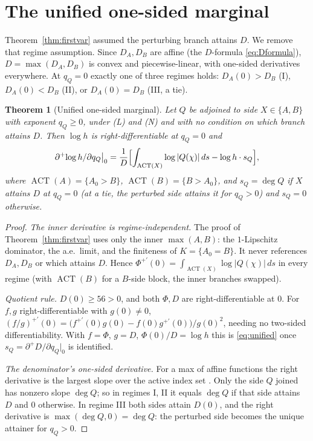 \documentclass[11pt,reqno]{amsart}
\theoremstyle{plain}
\newtheorem{theorem}{Theorem}
\theoremstyle{definition}
\theoremstyle{remark}
\newcommand{\dplus}{\partial^{+}}
\newcommand{\dA}{D_A}
\newcommand{\dB}{D_B}
\DeclareMathOperator{\ACT}{ACT}
\begin{document}
\section{The unified one-sided marginal}\label{sec:unified}

Theorem~\ref{thm:firstvar} assumed the perturbing branch attains $D$. We
remove that regime assumption. Since $\dA,\dB$ are affine (the $D$-formula \eqref{eq:Dformula}),
$D=\max(\dA,\dB)$ is convex and piecewise-linear, with one-sided derivatives
everywhere. At $q_Q=0$ exactly one of three regimes holds:
$\dA(0)>\dB$ (I), $\dA(0)<\dB$ (II), or $\dA(0)=\dB$ (III, a tie).

\begin{theorem}[Unified one-sided marginal]\label{thm:unified}
Let $Q$ be adjoined to side $X\in\{A,B\}$ with exponent $q_Q\ge0$, under
\emph{(L)} and \emph{(N)} and with no condition on which branch attains $D$. Then
$\log h$ is right-differentiable at $q_Q=0$ and
\begin{equation}\label{eq:unified}
  \dplus\!\log h/\partial q_Q\big|_0
  =\frac1D\Bigl[\int_{\ACT(X)}\log|Q(\chi)|\,ds-\log h\cdot s_Q\Bigr],
\end{equation}
where $\ACT(A)=\{A_0>B\}$, $\ACT(B)=\{B>A_0\}$, and $s_Q=\deg Q$ if $X$ attains $D$ at
$q_Q=0$ (at a tie, the perturbed side attains it for $q_Q>0$) and $s_Q=0$ otherwise.
\end{theorem}

\begin{proof}
\emph{The inner derivative is regime-independent.} The proof of
Theorem~\ref{thm:firstvar} uses only the inner $\max(A,B)$: the $1$-Lipschitz
dominator, the a.e.\ limit, and the finiteness of $K=\{A_0=B\}$. It never references
$\dA,\dB$ or which attains $D$. Hence
$\Phi^{+\prime}(0)=\int_{\ACT(X)}\log|Q(\chi)|\,ds$ in every regime (with $\ACT(B)$
for a $B$-side block, the inner branches swapped).

\emph{Quotient rule.} $D(0)\ge56>0$, and both $\Phi,D$ are right-differentiable at
$0$. For $f,g$ right-differentiable with $g(0)\ne0$,
$(f/g)^{+\prime}(0)=\bigl(f^{+\prime}(0)g(0)-f(0)g^{+\prime}(0)\bigr)/g(0)^2$, needing
no two-sided differentiability. With $f=\Phi$, $g=D$, $\Phi(0)/D=\log h$ this is
\eqref{eq:unified} once $s_Q=\dplus D/\partial q_Q|_0$ is identified.

\emph{The denominator's one-sided derivative.} For a max of affine functions the
right derivative is the largest slope over the active index set
\citep[Thm.~23.4]{Roc70}. Only the side $Q$ joined has nonzero slope $\deg Q$; so in
regimes I, II it equals $\deg Q$ if that side attains $D$ and $0$ otherwise. In
regime III both sides attain $D(0)$, and the right derivative is $\max(\deg Q,0)=\deg
Q$: the perturbed side becomes the unique attainer for $q_Q>0$.
\end{proof}
\end{document}

